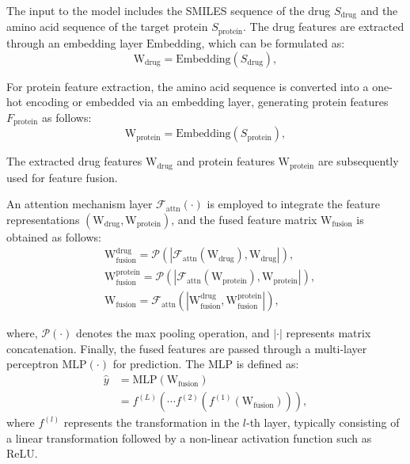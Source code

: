 \documentclass[unnumsec,webpdf,contemporary,large]{oup-authoring-template}%
\theoremstyle{thmstyleone}%
\theoremstyle{thmstyletwo}%
\theoremstyle{thmstylethree}%
\begin{document}
The input to the model includes the SMILES sequence of the drug $S_{\text{drug}}$ and the amino acid sequence of the target protein $S_{\text{protein}}$. The drug features are extracted through an embedding layer $\text{Embedding}$, which can be formulated as:
\begin{equation}
\text{W}_{\text{drug}} = \text{Embedding}(S_{\text{drug}}),
\end{equation}

For protein feature extraction, the amino acid sequence is converted into a one-hot encoding or embedded via an embedding layer, generating protein features $F_{\text{protein}}$ as follows:
\begin{equation}
\text{W}_{\text{protein}} = \text{Embedding}(S_{\text{protein}}),
\end{equation}

The extracted drug features $\text{W}_{\text{drug}}$ and protein features $\text{W}_{\text{protein}}$ are subsequently used for feature fusion.

An attention mechanism layer $ \mathcal{F}_ \text{attn}(\cdot)$ is employed to integrate the feature representations $(\text{W}_{\text{drug}}, \text{W}_{\text{protein}})$, and the fused feature matrix $\text{W}_{\text{fusion}}$ is obtained as follows:
\begin{align}
&\text{W}^{\text{drug}}_{\text{fusion}}  =   \mathcal{P}  \left( \left| \mathcal{F}_ \text{attn}(\text{W}_{\text{drug}}), \text{W}_{\text{drug}} \right| \right), \\
&\text{W}^{\text{protein}}_{\text{fusion}}  =  \mathcal{P} \left( \left| \mathcal{F}_ \text{attn}(\text{W}_{\text{protein}}), \text{W}_{\text{protein}} \right| \right), \\
&\text{W}_{\text{fusion}}  =  \mathcal{F}_ \text{attn} \left( \left| \text{W}^{\text{drug}}_{\text{fusion}}, \text{W}^{\text{protein}}_{\text{fusion}} \right| \right),
\end{align}

\noindent where, $\mathcal{P}(\cdot)$ denotes the max pooling operation, and $\left| \cdot \right|$ represents matrix concatenation. Finally, the fused features are passed through a multi-layer perceptron $\text{MLP}(\cdot)$ for prediction. The MLP is defined as:
\begin{align}
\hat{y} &= \text{MLP}(\text{W}_{\text{fusion}})\\
 &= f^{(L)} \left( \cdots f^{(2)}(f^{(1)}(\text{W}_{\text{fusion}})) \right),
\end{align}
\noindent where $f^{(l)}$ represents the transformation in the $l$-th layer, typically consisting of a linear transformation followed by a non-linear activation function such as ReLU.
\end{document}
